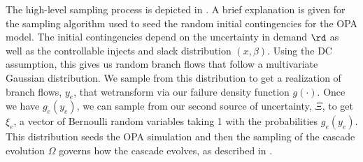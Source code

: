 The high-level sampling process is depicted in  . A brief explanation is given for the sampling algorithm used to seed the random initial contingencies for the OPA model.  The initial contingencies depend on the uncertainty in demand $\rd$ as well as the controllable injects and slack distribution $(x,\beta)$.  Using the DC assumption, this gives us random branch flows that follow a multivariate Gaussian distribution.  We sample from this distribution to get a realization of branch flows, $y_e$, that wetransform via our failure density function $g(\cdot)$.  Once we have $g_e(y_e)$, we can sample from our second source of uncertainty, $\Xi$, to get  $\xi_e$, a vector of Bernoulli random variables taking 1 with the probabilities $g_e(y_e)$.  This distribution seeds the OPA simulation and then the sampling of the cascade evolution $\Omega$  governs how the cascade evolves, as described in .

